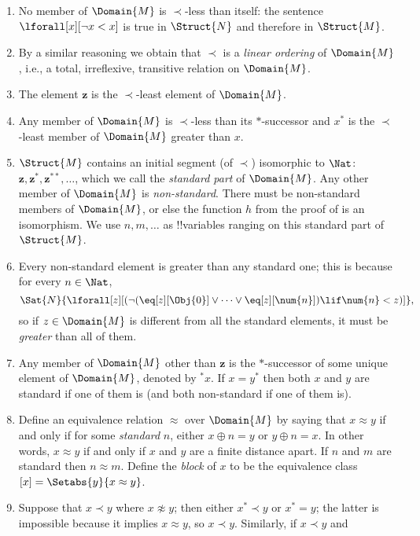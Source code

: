 \documentclass[../../include/open-logic-section]{subfiles}
\begin{document}
\begin{enumerate}
\item No member of $\Domain{M}$ is $\prec$-less than itself: the sentence
  $\lforall[x][\lnot x < x]$ is true in $\Struct{N}$ and therefore in
  $\Struct{M}$.
\item By a similar reasoning we obtain that $\prec$ is a \emph{linear
    ordering} of $\Domain{M}$, i.e., a total, irreflexive, transitive relation
  on $\Domain{M}$. 
\item The element $\mathbf{z}$ is the $\prec$-least element of $\Domain{M}$.
\item Any member of $\Domain{M}$ is $\prec$-less than its $*$-successor and
  $x^*$ is the $\prec$-least member of $\Domain{M}$ greater than $x$.
\item $\Struct{M}$ contains an initial segment (of $\prec$) isomorphic
  to $\Nat$: $\mathbf{z}, \mathbf{z}^*, \mathbf{z}^{**}, \dots$, which
  we call the \emph{standard part} of $\Domain{M}$. Any other member
  of $\Domain{M}$ is \emph{non-standard}. There must be non-standard
  members of $\Domain{M}$, or else the function $h$ from the proof of
   is an isomorphism.  We use $n, m, \dots$ as
  !!{variable}s ranging on this standard part of $\Struct{M}$.
\item Every non-standard element is greater than any standard one;
  this is because for every $n \in \Nat$,
  \[
  \Sat{N}{\lforall[z][(\lnot(\eq[z][\Obj{0}] \lor
  \dots \lor \eq[z][\num{n}]) \lif \num{n} < z)]},
  \]
  so if $z \in \Domain{M}$ is different from all the standard
  elements, it must be \emph{greater} than all of them.
\item Any member of $\Domain{M}$ other than $\mathbf{z}$ is the
  $*$-successor of some unique element of $\Domain{M}$, denoted by
  $^*x$. If $x = y^*$ then both $x$ and $y$ are standard if one of
  them is (and both non-standard if one of them is).
\item Define an equivalence relation $\approx$ over $\Domain{M}$ by
  saying that $x \approx y$ if and only if for some \emph{standard}
  $n$, either $x \oplus n = y$ or $y \oplus n =x$. In other words, $x
  \approx y$ if and only if $x$ and $y$ are a finite distance
  apart. If $n$ and $m$ are standard then $n \approx m$. Define the
  \emph{block} of $x$ to be the equivalence class $[x] = \Setabs{y}{x
  \approx y}$.
\item Suppose that $x \prec y$ where $x \not\approx y$; then either
  $x^* \prec y$ or $x^* = y$; the latter is impossible because it
  implies $x \approx y$, so $x \prec y$. Similarly, if $x \prec y$ and

\end{enumerate}
\end{document}
